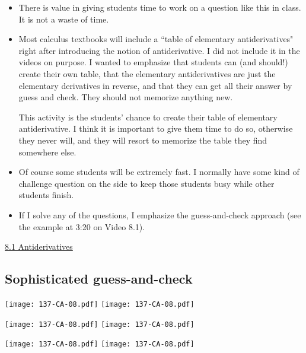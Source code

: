 \documentclass[11pt]{article}
\newcommand{\nl}{\hfill \vspace{-1.1\baselineskip}} %
\newcommand{\vi}{\hspace{8mm} \href{https://www.youtube.com/watch?v=xcyL3sEL2mM&list=PLlwePzQY_wW_8-sITAbG_GU2JgiuwXkDN&index=1}{8.1 Antiderivatives}}
\begin{document}
\begin{comments}
\nl
	\begin{itemize}
		\item There is value in giving students time to work on a question like this in class.  It is not a waste of time.
		\item  Most calculus textbooks will include a ``table of elementary antiderivatives" right after introducing the notion of antiderivative.  I did not include it in the videos on purpose.  I wanted to emphasize that students can (and should!) create their own table, that the elementary antiderivatives are just the elementary derivatives in reverse, and that they can get all their answer by guess and check.  They should not memorize anything new.
		
		This activity is the students' chance to create their table of elementary antiderivative.  I think it is important to give them time to do so, otherwise they never will, and they will resort to memorize the table they find somewhere else.  
		\item Of course some students will be extremely fast.  I normally have some kind of challenge question on the side to keep those students busy while other students finish.
		\item If I solve any of the questions, I emphasize the guess-and-check approach (see the example at 3:20 on Video 8.1).
	\end{itemize}
\end{comments}

\begin{videos}
\vi
\end{videos}

\newpage
\subsection{Sophisticated guess-and-check}

\begin{center}
{ \texttt{[image: 137-CA-08.pdf]}} \quad
{ \texttt{[image: 137-CA-08.pdf]}} 

{ \texttt{[image: 137-CA-08.pdf]}} \quad
{ \texttt{[image: 137-CA-08.pdf]}} 

{ \texttt{[image: 137-CA-08.pdf]}} \quad
{ \texttt{[image: 137-CA-08.pdf]}} 
\end{center}
\end{document}
